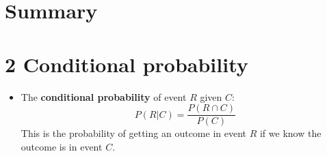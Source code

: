 
\ifind
\section*{Summary}
\else
\section*{2 Conditional probability}
\fi

\begin{itemize}
\item The \textbf{conditional probability} of event $R$ given $C$:
  \begin{equation}
P(R|C)=\frac{P(R\cap C)}{P(C)} 
  \end{equation}
  This is the probability of getting an outcome in event $R$ if we
  know the outcome is in event $C$.
\end{itemize}
